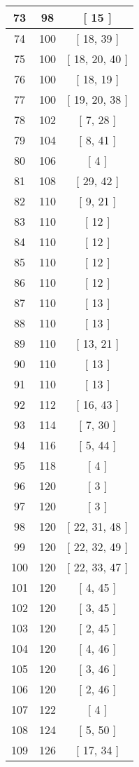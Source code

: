 \begin{center}
\begin{longtable}[H]{|| c c c ||}
\hline
73 & 98 & [ 15 ] \\ 
\hline
74 & 100 & [ 18, 39 ] \\ 
\hline
75 & 100 & [ 18, 20, 40 ] \\ 
\hline
76 & 100 & [ 18, 19 ] \\ 
\hline
77 & 100 & [ 19, 20, 38 ] \\ 
\hline
78 & 102 & [ 7, 28 ] \\ 
\hline
79 & 104 & [ 8, 41 ] \\ 
\hline
80 & 106 & [ 4 ] \\ 
\hline
81 & 108 & [ 29, 42 ] \\ 
\hline
82 & 110 & [ 9, 21 ] \\ 
\hline
83 & 110 & [ 12 ] \\ 
\hline
84 & 110 & [ 12 ] \\ 
\hline
85 & 110 & [ 12 ] \\ 
\hline
86 & 110 & [ 12 ] \\ 
\hline
87 & 110 & [ 13 ] \\ 
\hline
88 & 110 & [ 13 ] \\ 
\hline
89 & 110 & [ 13, 21 ] \\ 
\hline
90 & 110 & [ 13 ] \\ 
\hline
91 & 110 & [ 13 ] \\ 
\hline
92 & 112 & [ 16, 43 ] \\ 
\hline
93 & 114 & [ 7, 30 ] \\ 
\hline
94 & 116 & [ 5, 44 ] \\ 
\hline
95 & 118 & [ 4 ] \\ 
\hline
96 & 120 & [ 3 ] \\ 
\hline
97 & 120 & [ 3 ] \\ 
\hline
98 & 120 & [ 22, 31, 48 ] \\ 
\hline
99 & 120 & [ 22, 32, 49 ] \\ 
\hline
100 & 120 & [ 22, 33, 47 ] \\ 
\hline
101 & 120 & [ 4, 45 ] \\ 
\hline
102 & 120 & [ 3, 45 ] \\ 
\hline
103 & 120 & [ 2, 45 ] \\ 
\hline
104 & 120 & [ 4, 46 ] \\ 
\hline
105 & 120 & [ 3, 46 ] \\ 
\hline
106 & 120 & [ 2, 46 ] \\ 
\hline
107 & 122 & [ 4 ] \\ 
\hline
108 & 124 & [ 5, 50 ] \\ 
\hline
109 & 126 & [ 17, 34 ] \\ 

\end{longtable}
\end{center}
